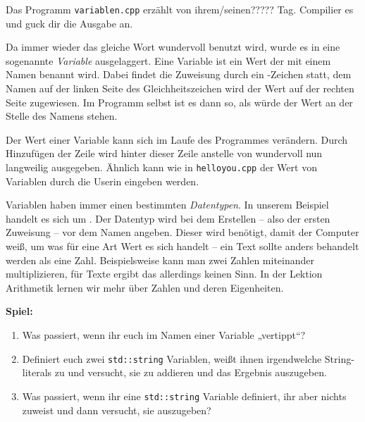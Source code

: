
Das Programm \texttt{variablen.cpp} erzählt von ihrem/seinen????? Tag.
Compilier es und guck dir die Ausgabe an.


Da immer wieder das gleiche Wort \glqq{}wundervoll\grqq{} benutzt wird, wurde es in eine sogenannte \emph{Variable} ausgelaggert.
Eine Variable ist ein Wert der mit einem Namen benannt wird.
Dabei findet die Zuweisung durch ein \cppinline{=}-Zeichen statt, dem Namen auf der linken Seite des Gleichheitszeichen wird der Wert auf der rechten Seite zugewiesen.
Im Programm selbst ist es dann so, als würde der Wert an der Stelle des Namens stehen.

Der Wert einer Variable kann sich im Laufe des Programmes verändern.
Durch Hinzufügen der Zeile  wird hinter dieser Zeile anstelle von \glqq{}wundervoll\grqq{} nun \glqq{}langweilig\grqq{} ausgegeben.
Ähnlich kann wie in \texttt{helloyou.cpp} der Wert von Variablen durch  die Userin eingeben werden.

Variablen haben immer einen bestimmten \emph{Datentypen}.
In unserem Beispiel handelt es sich um .
Der Datentyp wird bei dem Erstellen -- also der ersten Zuweisung -- vor dem Namen angeben.
Dieser wird benötigt, damit der Computer weiß, um was für eine Art Wert es sich handelt -- ein Text sollte anders behandelt werden als eine Zahl.
Beispielsweise kann man zwei Zahlen miteinander multiplizieren, für Texte ergibt das allerdings keinen Sinn.
In der Lektion Arithmetik lernen wir mehr über Zahlen und deren Eigenheiten.

\textbf{Spiel:}
\begin{enumerate}
    \item Was passiert, wenn ihr euch im Namen einer Variable „vertippt“?
    \item Definiert euch zwei \texttt{std::string} Variablen, weißt ihnen
        irgendwelche String-literals zu und versucht, sie zu addieren und das Ergebnis auszugeben.
    \item Was passiert, wenn ihr eine \texttt{std::string} Variable definiert,
        ihr aber nichts zuweist und dann versucht, sie auszugeben?
\end{enumerate}
